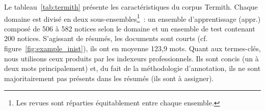     \begin{table}
      \centering

      \caption{Détail des revues du corpus de chimie (Termith)
               \label{tab:chemestry_journals}}
    \end{table}

    Le tableau~\ref{tab:termith} présente les caractéristiques du corpus
    Termith. Chaque domaine est divisé en deux sous-ensembles\footnote{Les
    revues sont réparties équitablement entre chaque ensemble.}~: un ensemble
    d'apprentissage (appr.) composé de 506 à 582 notices selon le domaine et un
    ensemble de test contenant 200 notices. S'agissant de résumés, les documents
    sont courts (cf. figure~\ref{fig:example_inist}), ils ont en moyenne 123,9
    mots. Quant aux termes-clés, nous utilisons ceux produits par les indexeurs
    professionnels. Ils sont concis (un à deux mots principalement) et, du fait
    de la méthodologie d'annotation, ils ne sont majoritairement pas présents
    dans les résumés (ils sont \og{}à assigner\fg{}).

